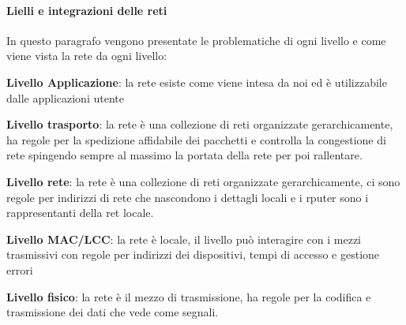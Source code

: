 \documentclass{article}
\begin{document}
\paragraph{Lielli e integrazioni delle reti}
In questo paragrafo vengono presentate le problematiche di ogni livello e come
viene vista la rete da ogni livello:
\begin{etaremune}
    \item \textbf{Livello Applicazione}: la rete esiste come viene intesa da noi ed è utilizzabile dalle applicazioni utente
    \item \textbf{Livello trasporto}: la rete è una collezione di reti organizzate gerarchicamente, ha regole per la spedizione affidabile dei pacchetti e controlla la congestione di rete spingendo
    sempre al massimo la portata della rete per poi rallentare.
    \item \textbf{Livello rete}: la rete è una collezione di reti organizzate gerarchicamente, ci sono regole per indirizzi di rete che nascondono i dettagli locali e i rputer sono i rappresentanti della ret locale.
    \item \textbf{Livello MAC/LCC}: la rete è locale, il livello può interagire con i mezzi trasmissivi con regole per indirizzi dei dispositivi, tempi di accesso e gestione errori
    \item \textbf{Livello fisico}: la rete è il mezzo di trasmissione, ha regole per la codifica e trasmissione dei dati che vede come segnali.
\end{etaremune}
\end{document}
